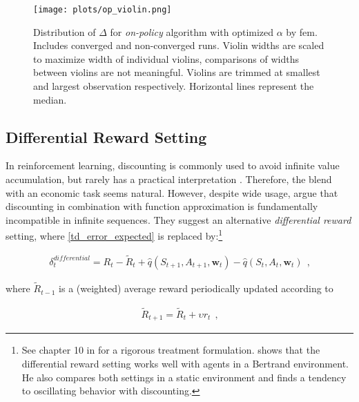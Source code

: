 \begin{figure}
	\texttt{[image: plots/op\_violin.png]}
	\caption[Distribution of $\Delta$ for \emph{on-policy} algorithm with optimized $\alpha$ by \gls{fem}]{Distribution of $\Delta$ for \emph{on-policy} algorithm with optimized $\alpha$ by \gls{fem}. Includes converged and non-converged runs. Violin widths are scaled to maximize width of individual violins, comparisons of widths between violins are not meaningful. Violins are trimmed at smallest and largest observation respectively. Horizontal lines represent the median.}
	\label{op_violin}
\end{figure}

		
\subsection{Differential Reward Setting}\label{differential}

In reinforcement learning, discounting is commonly used to avoid infinite value accumulation, but rarely has a practical interpretation \parencite{schwartz_reinforcement_1993}. Therefore, the blend with an economic task seems natural. However, despite wide usage, \textcite{naik_discounted_2019} argue that discounting in combination with function approximation is fundamentally incompatible in infinite sequences. They suggest an alternative \emph{differential reward} setting, where \autoref{td_error_expected} is replaced by:\footnote{See chapter 10 in \textcite{sutton_reinforcement_2018} for a rigorous treatment formulation. \textcite{hettich_algorithmic_2021} shows that the differential reward setting works well with agents in a Bertrand environment. He also compares both settings in a static environment and finds a tendency to oscillating behavior with discounting.}


\begin{gather}\label{differential_reward}
\delta_t^{differential} = R_t - \widetilde{R}_{t} + \hat{q}(S_{t+1}, A_{t+1}, \boldsymbol{w}_t) - \hat{q}(S_t, A_t, \boldsymbol{w}_t) ~~  \text{,}
\end{gather}

where $\widetilde{R}_{t-1}$ is a (weighted) average reward periodically updated according to

\begin{gather}
	\widetilde{R}_{t+1} = \widetilde{R}_t + \upsilon r_t ~~\text{,}
\end{gather}

